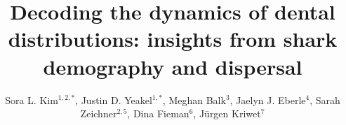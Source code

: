 \documentclass[]{rsos}%
\begin{document}
\title{Decoding the dynamics of dental distributions: insights from shark demography and dispersal}


\author{%
Sora L. Kim$^{1,2,*}$, Justin D. Yeakel$^{1,*}$, Meghan Balk$^{3}$, Jaelyn J. Eberle$^{4}$, Sarah Zeichner$^{2,5}$, Dina Fieman$^{6}$, J\"urgen Kriwet$^{7}$}

\address{\footnotesize{$^{1}$School of Natural Science, University of California Merced,$^{2}$Department of Geophysical Sciences, University of Chicago, $^{3}$National Ecological Observatory Network, $^{4}$Department of Geological Sciences and Museum of Natural History, University of Colorado,
$^{5}$Division of Geological and Planetary Sciences, California Institute of Technology, $^{6}$School of Geography, Environment, and Earth Sciences, Victoria University of Wellington, $^{7}$Department of Paleontology, University of Vienna
$^{*}$Contributed equally}}


\subject{paleontology, ecology, body size, migration, nursery}


\end{document}

